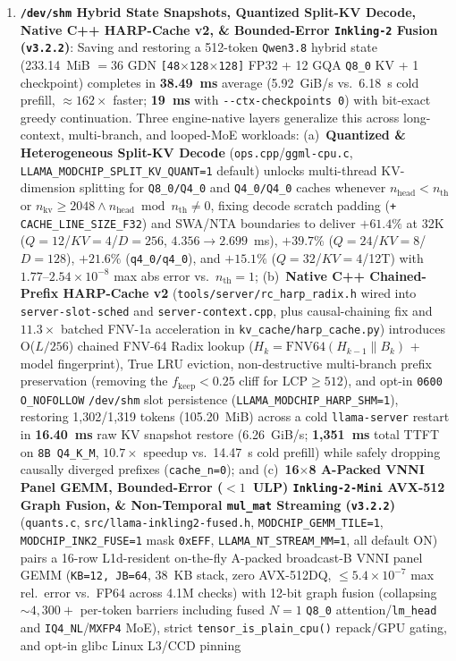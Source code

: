\documentclass[10pt,twocolumn]{article}
\begin{document}
\begin{enumerate}
    \item \textbf{\texttt{/dev/shm} Hybrid State Snapshots, Quantized Split-KV Decode, Native C++ HARP-Cache v2, \& Bounded-Error \texttt{Inkling-2} Fusion (\texttt{v3.2.2})}: Saving and restoring a 512-token \texttt{Qwen3.8} hybrid state (233.14~MiB $= 36$ GDN \texttt{[48$\times$128$\times$128]} FP32 + 12 GQA \texttt{Q8\_0} KV + 1 checkpoint) completes in \textbf{38.49~ms} average (5.92~GiB/s vs.\ 6.18~s cold prefill, ${\approx}162\times$ faster; \textbf{19~ms} with \texttt{{-}{-}ctx-checkpoints 0}) with bit-exact greedy continuation. Three engine-native layers generalize this across long-context, multi-branch, and looped-MoE workloads: (a)~\textbf{Quantized \& Heterogeneous Split-KV Decode} (\texttt{ops.cpp}/\texttt{ggml-cpu.c}, \texttt{LLAMA\_MODCHIP\_SPLIT\_KV\_QUANT=1} default) unlocks multi-thread KV-dimension splitting for \texttt{Q8\_0/Q4\_0} and \texttt{Q4\_0/Q4\_0} caches whenever $n_{\text{head}} < n_{\text{th}}$ or $n_{\text{kv}} \ge 2048 \land n_{\text{head}} \bmod n_{\text{th}} \ne 0$, fixing decode scratch padding (\texttt{+ CACHE\_LINE\_SIZE\_F32}) and SWA/NTA boundaries to deliver \textbf{$+61.4\%$} at 32K ($Q{=}12$/$KV{=}4$/$D{=}256$, $4.356 \to 2.699$~ms), \textbf{$+39.7\%$} ($Q{=}24$/$KV{=}8$/$D{=}128$), \textbf{$+21.6\%$} (\texttt{q4\_0/q4\_0}), and \textbf{$+15.1\%$} ($Q{=}32$/$KV{=}4$/12T) with $1.77$--$2.54 \times 10^{-8}$ max abs error vs.\ $n_{\text{th}}{=}1$; (b)~\textbf{Native C++ Chained-Prefix HARP-Cache v2} (\texttt{tools/server/rc\_harp\_radix.h} wired into \texttt{server-slot-sched} and \texttt{server-context.cpp}, plus causal-chaining fix and $11.3\times$ batched FNV-1a acceleration in \texttt{kv\_cache/harp\_cache.py}) introduces O($L/256$) chained FNV-64 Radix lookup ($H_k = \text{FNV64}(H_{k-1} \parallel B_k)$ + model fingerprint), True LRU eviction, non-destructive multi-branch prefix preservation (removing the $f_{\text{keep}}<0.25$ cliff for $\text{LCP}\ge 512$), and opt-in \texttt{0600} \texttt{O\_NOFOLLOW} \texttt{/dev/shm} slot persistence (\texttt{LLAMA\_MODCHIP\_HARP\_SHM=1}), restoring 1,302/1,319 tokens (105.20~MiB) across a cold \texttt{llama-server} restart in \textbf{16.40~ms} raw KV snapshot restore (6.26~GiB/s; \textbf{1,351~ms} total TTFT on \texttt{8B Q4\_K\_M}, $10.7\times$ speedup vs.\ 14.47~s cold prefill) while safely dropping causally diverged prefixes (\texttt{cache\_n=0}); and (c)~\textbf{16$\times$8 A-Packed VNNI Panel GEMM, Bounded-Error ($<1$~ULP) \texttt{Inkling-2-Mini} AVX-512 Graph Fusion, \& Non-Temporal \texttt{mul\_mat} Streaming (\texttt{v3.2.2})} (\texttt{quants.c}, \texttt{src/llama-inkling2-fused.h}, \texttt{MODCHIP\_GEMM\_TILE=1}, \texttt{MODCHIP\_INK2\_FUSE=1} mask \texttt{0xEFF}, \texttt{LLAMA\_NT\_STREAM\_MM=1}, all default ON) pairs a 16-row L1d-resident on-the-fly A-packed broadcast-B VNNI panel GEMM (\texttt{KB=12, JB=64}, 38~KB stack, zero AVX-512DQ, $\le 5.4\times 10^{-7}$ max rel.\ error vs.\ FP64 across 4.1M checks) with 12-bit graph fusion (collapsing ${\sim}4{,}300+$ per-token barriers including fused $N{=}1$ \texttt{Q8\_0} attention/\texttt{lm\_head} and \texttt{IQ4\_NL}/\texttt{MXFP4} MoE), strict \texttt{tensor\_is\_plain\_cpu()} repack/GPU gating, and opt-in glibc Linux L3/CCD pinning 
\end{enumerate}
\end{document}
